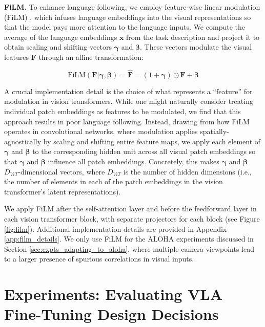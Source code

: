 \documentclass[conference]{IEEEtran}
\begin{document}
\textbf{FiLM.} To enhance language following, we employ feature-wise linear modulation (FiLM) \citep{perez2018film}, which infuses language embeddings into the visual representations so that the model pays more attention to the language inputs. We compute the average of the language embeddings $\mathbf{x}$ from the task description and project it to obtain scaling and shifting vectors $\mathbf{\gamma}$ and $\mathbf{\beta}$. These vectors modulate the visual features $\mathbf{F}$ through an affine transformation:

\[
\text{FiLM}(\mathbf{F}|\mathbf{\gamma},\mathbf{\beta}) = \mathbf{\hat{F}} = (1 + \mathbf{\gamma}) \odot \mathbf{F} + \mathbf{\beta}
\]

A crucial implementation detail is the choice of what represents a ``feature'' for modulation in vision transformers. While one might naturally consider treating individual patch embeddings as features to be modulated, we find that this approach results in poor language following. Instead, drawing from how FiLM operates in convolutional networks, where modulation applies spatially-agnostically by scaling and shifting entire feature maps, we apply each element of $\mathbf{\gamma}$ and $\mathbf{\beta}$ to the corresponding hidden unit across all visual patch embeddings so that $\mathbf{\gamma}$ and $\mathbf{\beta}$ influence all patch embeddings. Concretely, this makes $\mathbf{\gamma}$ and $\mathbf{\beta}$ $D_{ViT}$-dimensional vectors, where $D_{ViT}$ is the number of hidden dimensions (i.e., the number of elements in each of the patch embeddings in the vision transformer's latent representations).

We apply FiLM after the self-attention layer and before the feedforward layer in each vision transformer block, with separate projectors for each block (see Figure \ref{fig:film}). Additional implementation details are provided in Appendix \ref{app:film_details}. We only use FiLM for the ALOHA experiments discussed in Section \ref{sec:expts_adapting_to_aloha}, where multiple camera viewpoints lead to a larger presence of spurious correlations in visual inputs.











\section{Experiments: Evaluating VLA Fine-Tuning Design Decisions}
\label{sec:expts_evaluating_design_decisions}
\end{document}
